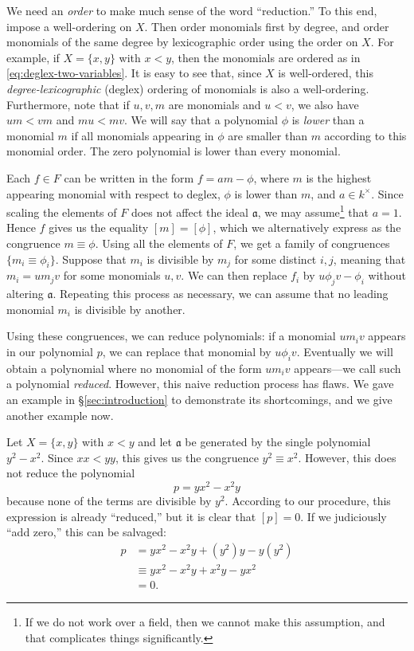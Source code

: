 We need an \emph{order} to make much sense of the word ``reduction.'' To this end, impose a well-ordering on $X$. Then order monomials first by degree, and order monomials of the same degree by lexicographic order using the order on $X$. For example, if $X = \{x,y\}$ with $x < y$, then the monomials are ordered as in \eqref{eq:deglex-two-variables}.
It is easy to see that, since $X$ is well-ordered, this \emph{degree-lexicographic} (deglex) ordering of monomials is also a well-ordering. Furthermore, note that if $u,v,m$ are monomials and $u < v$, we also have $um < vm$ and $mu < mv$. We will say that a polynomial $\phi$ is \emph{lower} than a monomial $m$ if all monomials appearing in $\phi$ are smaller than $m$ according to this monomial order. The zero polynomial is lower than every monomial.

Each $f \in F$ can be written in the form $f = am - \phi$, where $m$ is the highest appearing monomial with respect to deglex, $\phi$ is lower than $m$, and $a \in k^\times$. Since scaling the elements of $F$ does not affect the ideal $\mathfrak{a}$, we may assume\footnote{If we do not work over a field, then we cannot make this assumption, and that complicates things significantly.} that $a = 1$. Hence $f$ gives us the equality $[m] = [\phi]$, which we alternatively express as the congruence $m \equiv \phi$. Using all the elements of $F$, we get a family of congruences $\{ m_i \equiv \phi_i \}$. Suppose that $m_i$ is divisible by $m_j$ for some distinct $i,j$, meaning that $m_i = um_jv$ for some monomials $u,v$. We can then replace $f_i$ by $u\phi_j v - \phi_i$ without altering $\mathfrak{a}$. Repeating this process as necessary, we can assume that no leading monomial $m_i$ is divisible by another.

Using these congruences, we can reduce polynomials: if a monomial $u m_i v$ appears in our polynomial $p$, we can replace that monomial by $u \phi_i v$. Eventually we will obtain a polynomial where no monomial of the form $u m_i v$ appears---we call such a polynomial \emph{reduced}. However, this naive reduction process has flaws. We gave an example in \S\ref{sec:introduction} to demonstrate its shortcomings, and we give another example now.

\begin{example}\label{exa:x2-y2}
	Let $X=\{x,y\}$ with $x < y$ and let $\mathfrak{a}$ be generated by the single polynomial $y^2 - x^2$. Since $xx < yy$, this gives us the congruence $y^2 \equiv x^2$. However, this does not reduce the polynomial
	\[
		p = yx^2 - x^2 y
	\]
	because none of the terms are divisible by $y^2$. According to our procedure, this expression is already ``reduced,'' but it is clear that $[p]=0$. If we judiciously ``add zero,'' this can be salvaged:
	\begin{align*}
		p &= yx^2 - x^2 y + (y^2)y - y(y^2)\\
		&\equiv yx^2 - x^2 y + x^2 y - y x^2\\
		&= 0.
	\end{align*}
\end{example}

